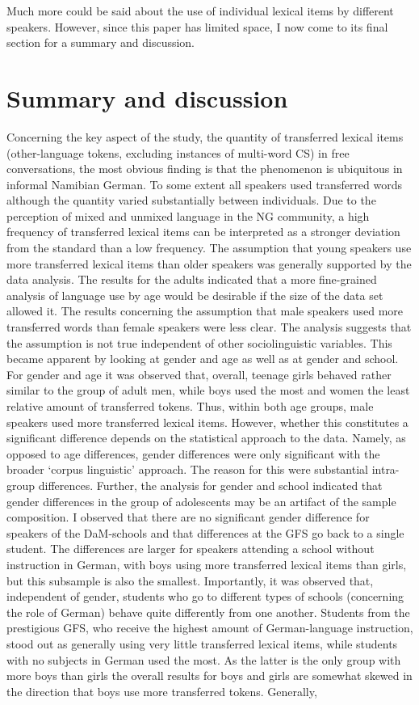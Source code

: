 \documentclass[output=paper]{langsci/langscibook}
\begin{document}
Much more could be said about the use of individual lexical items by different speakers. However, since this paper has limited space, I now come to its final section for a summary and discussion.

 
\section{Summary and discussion}
\label{sec:bracke:6}
 

Concerning the key aspect of the study, the quantity of transferred lexical items (other-language tokens, excluding instances of multi-word CS) in free conversations, the most obvious finding is that the phenomenon is ubiquitous in informal Namibian German. To some extent all speakers used transferred words although the quantity varied substantially between individuals. Due to the perception of mixed and unmixed language in the NG community, a high frequency of transferred lexical items can be interpreted as a stronger deviation from the standard than a low frequency. The assumption that young speakers use more transferred lexical items than older speakers was generally supported by the data analysis. The results for the adults indicated that a more fine-grained analysis of language use by age would be desirable if the size of the data set allowed it. The results concerning the assumption that male speakers used more transferred words than female speakers were less clear. The analysis suggests that the assumption is not true independent of other sociolinguistic variables. This became apparent by looking at gender and age as well as at gender and school. For gender and age it was observed that, overall, teenage girls behaved rather similar to the group of adult men, while boys used the most and women the least relative amount of transferred tokens. Thus, within both age groups, male speakers used more transferred lexical items. However, whether this constitutes a significant difference depends on the statistical approach to the data. Namely, as opposed to age differences, gender differences were only significant with the broader ‘corpus linguistic’ approach. The reason for this were substantial intra-group differences. Further, the analysis for gender and school indicated that gender differences in the group of adolescents may be an artifact of the sample composition. I observed that there are no significant gender difference for speakers of the DaM-schools and that differences at the GFS go back to a single student. The differences are larger for speakers attending a school without instruction in German, with boys using more transferred lexical items than girls, but this subsample is also the smallest. Importantly, it was observed that, independent of gender, students who go to different types of schools (concerning the role of German) behave quite differently from one another. Students from the prestigious GFS, who receive the highest amount of German-language instruction, stood out as generally using very little transferred lexical items, while students with no subjects in German used the most. As the latter is the only group with more boys than girls the overall results for boys and girls are somewhat skewed in the direction that boys use more transferred tokens. Generally, 
\end{document}
